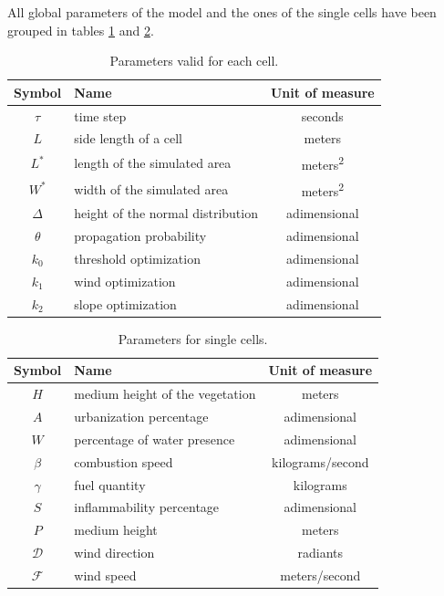 \documentclass[Lau]{sapthesis} %
\begin{document}
All global parameters of the model and the ones of the single cells have been
grouped in tables \ref{tab:globals} and \ref{tab:params}.

\begin{table}
\centering
\begin{tabular}{|c|l|c|}
	\hline
	\textbf{Symbol} & \textbf{Name} & \textbf{Unit of measure}\\
	\hline
	$\tau$ & time step & seconds\\
	$L$ & side length of a cell & meters\\
	$L^*$ & length of the simulated area & meters\textsuperscript{2}\\
	$W^*$ & width of the simulated area & meters\textsuperscript{2}\\
	$\Delta$ & height of the normal distribution & adimensional\\
	$\theta$ & propagation probability & adimensional\\
	$k_0$ & threshold optimization & adimensional\\
	$k_1$ & wind optimization & adimensional\\
	$k_2$ & slope optimization & adimensional\\
	\hline
\end{tabular}
\caption{Parameters valid for each cell.}
\label{tab:globals}
\end{table}

\begin{table}
\centering
\begin{tabular}{|c|l|c|}
	\hline
	\textbf{Symbol} & \textbf{Name} & \textbf{Unit of measure}\\
	\hline
	$H$ & medium height of the vegetation & meters\\
	$A$ & urbanization percentage & adimensional\\
	$W$ & percentage of water presence & adimensional\\
	$\beta$ & combustion speed & kilograms/second\\
	$\gamma$ & fuel quantity & kilograms\\
	$S$ & inflammability percentage & adimensional\\
	$P$ & medium height & meters\\
	$\mathcal{D}$ & wind direction & radiants\\
	$\mathcal{F}$ & wind speed & meters/second\\
	\hline
\end{tabular}
\caption{Parameters for single cells.}
\label{tab:params}
\end{table}
\end{document}
